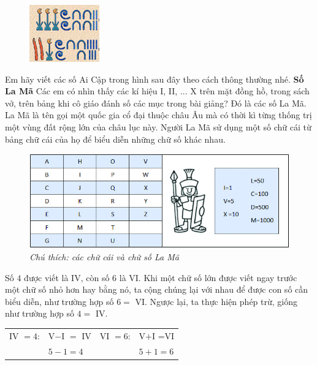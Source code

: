 	\vskip 0.1cm 
	
	\begin{figure}
		\vspace*{-10pt}
		\centering
		\captionsetup{labelformat=empty, justification=centering}
		\includegraphics[scale=1]{13}
		\vspace*{-10pt}
	\end{figure}                          
	Em hãy viết các số Ai Cập trong hình sau đây theo cách thông thường nhé.    
	\vskip 0.1cm
	\textbf{\color{toancuabi}Số La Mã}
	\vskip 0.1cm
	Các em có nhìn thấy các kí hiệu I, II, ... X trên mặt đồng hồ, trong sách vở, trên bảng khi cô giáo đánh số các mục trong bài giảng? Đó là các số La Mã. La Mã là tên gọi một quốc gia cổ đại thuộc châu Âu mà có thời kì từng thống trị một vùng đất rộng lớn của châu lục này. Người La Mã sử dụng một số chữ cái từ bảng chữ cái của họ để biểu diễn những chữ số khác nhau.
	\begin{figure}[H]
		\centering
		\vspace*{-10pt}
		\captionsetup{labelformat= empty, justification=centering}
		\includegraphics[width=1\linewidth]{14a}
		\caption{\small\textit{Chú thích: các chữ cái và chữ số La Mã}}
		\vspace*{-10pt}
	\end{figure}
	Số $4$ được viết là IV, còn số $6$ là VI. Khi một chữ số lớn được viết ngay trước  một chữ số nhỏ hơn hay bằng nó, ta cộng chúng lại với nhau để được con số cần biểu diễn, như trường hợp số $6=$ VI. Ngược lại, ta thực hiện phép trừ, giống như trường hợp số $4=$ IV.
	\begin{table}[H]
		\vspace*{-5pt}
		\centering
			\begin{tabular}{|l l|l l|}
			\hline
			IV $=4$:&    V$-$I $=$ IV & VI $=6$:&    V$+$I =VI\\
			&$5-1=4$ & &$5+1=6$\\
			\hline
		\end{tabular}
		\vspace*{-10pt}
	\end{table}
